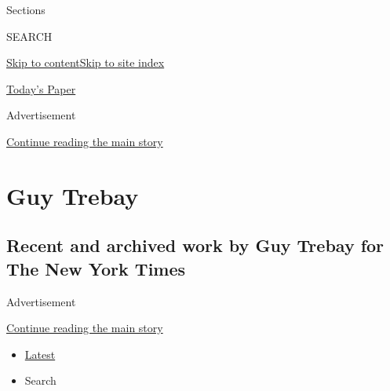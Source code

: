Sections

SEARCH

\protect\hyperlink{site-content}{Skip to
content}\protect\hyperlink{site-index}{Skip to site index}

\href{https://myaccount.nytimes3xbfgragh.onion/auth/login?response_type=cookie\&client_id=vi}{}

\href{https://www.nytimes3xbfgragh.onion/section/todayspaper}{Today's
Paper}

Advertisement

\protect\hyperlink{after-top}{Continue reading the main story}

\hypertarget{guy-trebay}{%
\section{Guy Trebay}\label{guy-trebay}}

\hypertarget{recent-and-archived-work-by-guy-trebay-for-the-new-york-times}{%
\subsection{Recent and archived work by Guy Trebay for The New York
Times}\label{recent-and-archived-work-by-guy-trebay-for-the-new-york-times}}

Advertisement

\protect\hyperlink{after-mid1}{Continue reading the main story}

\begin{itemize}
\tightlist
\item
  \protect\hyperlink{stream-panel}{Latest}
\item
  Search
\end{itemize}

